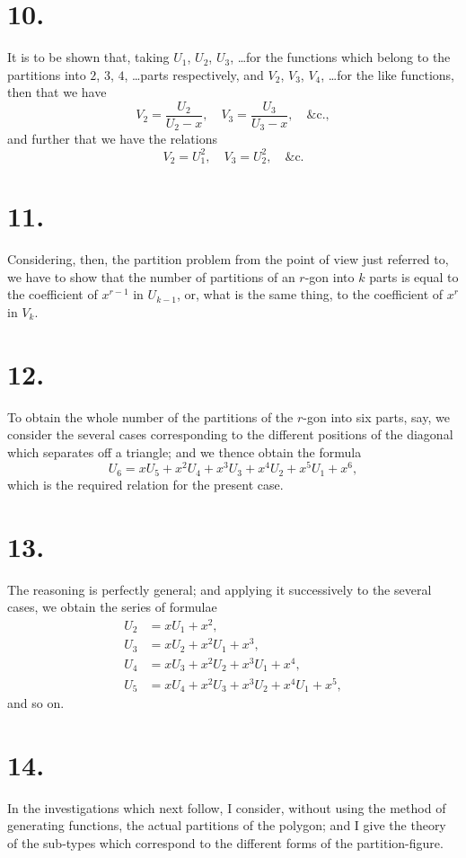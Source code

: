 \documentclass[11pt,a4paper]{book}
\begin{document}
\section*{10.}
It is to be shown that, taking $U_1$, $U_2$, $U_3$, \ldots for the functions which belong to the partitions into $2$, $3$, $4$, \ldots parts respectively, and $V_2$, $V_3$, $V_4$, \ldots for the like functions, then that we have
\[
V_2 = \frac{U_2}{U_2 - x}, \quad V_3 = \frac{U_3}{U_3 - x}, \quad \&\text{c.},
\]
and further that we have the relations
\[
V_2 = U_1^2, \quad V_3 = U_2^2, \quad \&\text{c.}
\]

\section*{11.}
Considering, then, the partition problem from the point of view just referred to, we have to show that the number of partitions of an $r$-gon into $k$ parts is equal to the coefficient of $x^{r-1}$ in $U_{k-1}$, or, what is the same thing, to the coefficient of $x^r$ in $V_k$.

\section*{12.}
To obtain the whole number of the partitions of the $r$-gon into six parts, say, we consider the several cases corresponding to the different positions of the diagonal which separates off a triangle; and we thence obtain the formula
\[
U_6 = xU_5 + x^2U_4 + x^3U_3 + x^4U_2 + x^5U_1 + x^6,
\]
which is the required relation for the present case.

\section*{13.}
The reasoning is perfectly general; and applying it successively to the several cases, we obtain the series of formulae
\begin{align*}
U_2 &= xU_1 + x^2, \\
U_3 &= xU_2 + x^2U_1 + x^3, \\
U_4 &= xU_3 + x^2U_2 + x^3U_1 + x^4, \\
U_5 &= xU_4 + x^2U_3 + x^3U_2 + x^4U_1 + x^5,
\end{align*}
and so on.

\section*{14.}
In the investigations which next follow, I consider, without using the method of generating functions, the actual partitions of the polygon; and I give the theory of the sub-types which correspond to the different forms of the partition-figure.
\end{document}
